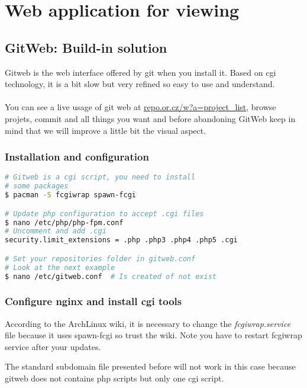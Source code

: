\section{Web application for viewing}
\subsection{GitWeb: Build-in solution}
Gitweb is the web interface offered by git when you install it. Based on cgi 
technology, it is a bit slow but very refined so easy to use and understand.
\\\\
You can see a live usage of git web at \href{http://repo.or.cz/w?a=project\_list}
{repo.or.cz/w?a=project\_list}, browse projets, commit and all things you want and 
before abandoning GitWeb keep in mind that we will improve a little bit the visual 
aspect.

\subsubsection{Installation and configuration}
\begin{lstlisting}[language=bash,caption=Gitweb setup]
# Gitweb is a cgi script, you need to install 
# some packages
$ pacman -S fcgiwrap spawn-fcgi

# Update php configuration to accept .cgi files
$ nano /etc/php/php-fpm.conf
# Uncomment and add .cgi
security.limit_extensions = .php .php3 .php4 .php5 .cgi

# Set your repositories folder in gitweb.conf
# Look at the next example
$ nano /etc/gitweb.conf  # Is created of not exist
\end{lstlisting}

\lstset{language=bash,caption=gitweb.conf file}


\subsubsection{Configure nginx and install cgi tools}
According to the ArchLinux wiki, it is necessary to change the \emph{fcgiwrap.service} 
file because it uses spawn-fcgi so trust the wiki. Note you have to restart 
fcgiwrap service after your updates.

\lstset{language=bash,caption=fcgiwrap.service from wiki.archlinux.org/index.php/gitweb}


The standard subdomain file presented before will not work in this case because 
gitweb does not contains php scripts but only one cgi script.

